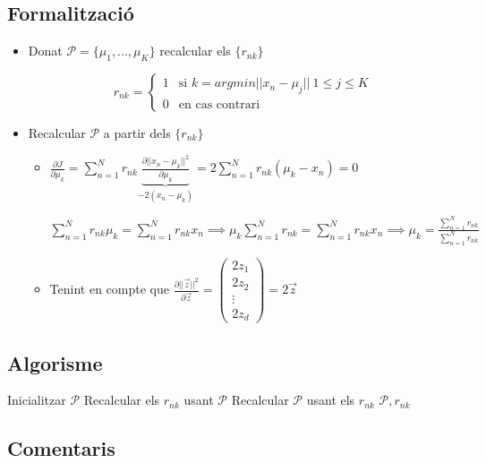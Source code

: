\subsection{Formalització}
\begin{itemize}
	\item Donat $\mathcal{P} = \{ \mu_1, ..., \mu_K \}$ recalcular els $\{r_{nk}\}$
	
	$$ r_{nk} =
	\begin{cases}
	1 & \text{si } k = argmin ||x_n - \mu_j||\ 1 \le j \le K \\ 0 & \text{en cas contrari}
	\end{cases}$$
	
	\item Recalcular $\mathcal{P}$ a partir dels $\{r_{nk}\}$
	
	\begin{itemize}
		\item $\frac{\partial J}{\partial \mu_k} = \sum_{n=1}^N r_{nk} \underbrace{\frac{\partial ||x_n - \mu_k||^2}{\partial \mu_k}}_{-2(x_n - \mu_k)} = 2\sum_{n=1}^N r_{nk} (\mu_k - x_n) = 0$
		
		$\sum_{n=1}^N r_{nk}\mu_k = \sum_{n=1}^N r_{nk}x_n \implies \mu_k\sum_{n=1}^N r_{nk} = \sum_{n=1}^N r_{nk}x_n \implies \boxed{\mu_k = \frac{\sum_{n=1}^N r_{nk}}{\sum_{n=1}^N r_{nk}}}$
		
		\item Tenint en compte que $\frac{\partial ||\vec{z}||^2}{\partial \vec{z}} = \begin{pmatrix}
		2z_1 \\ 2z_2 \\ \vdots \\ 2z_d
		\end{pmatrix} = 2\vec{z}$
	\end{itemize}
\end{itemize}

\subsection{Algorisme}

\begin{algorithmic}
    \State Inicialitzar $\mathcal{P}$
        \State Recalcular els $r_{nk}$ usant $\mathcal{P}$
        \State Recalcular $\mathcal{P}$ usant els $r_{nk}$
    \EndWhile
    \State \Return $\mathcal{P},r_{nk}$
\end{algorithmic}


\subsection{Comentaris}

